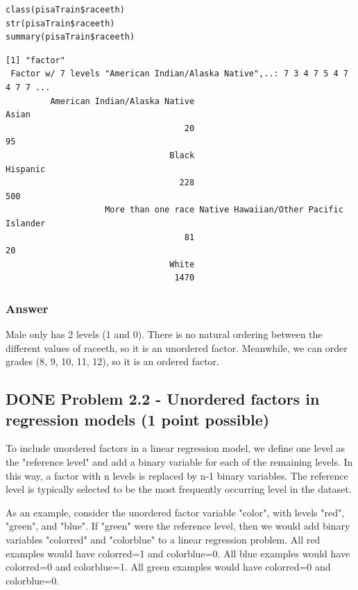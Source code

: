\documentclass[letterpaper, 9pt, onecolumn, twoside, technote, final]{IEEEtran}
\begin{document}
\begin{verbatim}
class(pisaTrain$raceeth)
str(pisaTrain$raceeth)
summary(pisaTrain$raceeth)
\end{verbatim}

\begin{verbatim}
[1] "factor"
 Factor w/ 7 levels "American Indian/Alaska Native",..: 7 3 4 7 5 4 7 4 7 7 ...
         American Indian/Alaska Native                                  Asian
                                    20                                     95
                                 Black                               Hispanic
                                   228                                    500
                    More than one race Native Hawaiian/Other Pacific Islander
                                    81                                     20
                                 White
                                  1470
\end{verbatim}

\subsubsection{Answer}
\label{sec-2-5-3}

Male only has 2 levels (1 and 0). There is no natural ordering between
the different values of raceeth, so it is an unordered
factor. Meanwhile, we can order grades (8, 9, 10, 11, 12), so it is an
ordered factor.

\subsection{{\bfseries\sffamily DONE} Problem 2.2 - Unordered factors in regression models (1 point possible)}
\label{sec-2-6}
To include unordered factors in a linear regression model, we define
one level as the "reference level" and add a binary variable for each
of the remaining levels. In this way, a factor with n levels is
replaced by n-1 binary variables. The reference level is typically
selected to be the most frequently occurring level in the dataset.

As an example, consider the unordered factor variable "color", with
levels "red", "green", and "blue". If "green" were the reference
level, then we would add binary variables "colorred" and "colorblue"
to a linear regression problem. All red examples would have colorred=1
and colorblue=0. All blue examples would have colorred=0 and
colorblue=1. All green examples would have colorred=0 and
colorblue=0.
\end{document}
